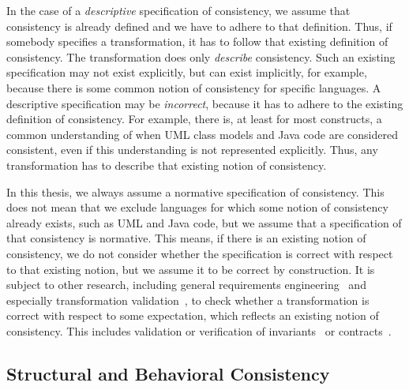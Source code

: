 In the case of a \emph{descriptive} specification of consistency, we assume that consistency is already defined and we have to adhere to that definition.
Thus, if somebody specifies a transformation, it has to follow that existing definition of consistency. 
The transformation does only \emph{describe} consistency.
Such an existing specification may not exist explicitly, but can exist implicitly, for example, because there is some common notion of consistency for specific languages.
A descriptive specification may be \emph{incorrect}, because it has to adhere to the existing definition of consistency.
For example, there is, at least for most constructs, a common understanding of when \gls{UML} class models and Java code are considered consistent, even if this understanding is not represented explicitly.
Thus, any transformation has to describe that existing notion of consistency.

In this thesis, we always assume a normative specification of consistency.
This does not mean that we exclude languages for which some notion of consistency already exists, such as \gls{UML} and Java code, but we assume that a specification of that consistency is normative.
This means, if there is an existing notion of consistency, we do not consider whether the specification is correct with respect to that existing notion, but we assume it to be correct by construction.
It is subject to other research, including general requirements engineering~\cite{tehrani2016requirementsTransformations-ICMT} and especially transformation validation~\cite{rahim2015SurveyTransformationVerification-SoSym}, to check whether a transformation is correct with respect to some expectation, which reflects an existing notion of consistency.
This includes validation or verification of invariants~\cite{cabot2010VerificationInvariants-JSS} or contracts~\cite{azizi2017ContractVerification-ICCKE, vallecillo2012FormalTesting-FMMDE}.


\subsection{Structural and Behavioral Consistency}
\label{chap:networks:notions:types}

